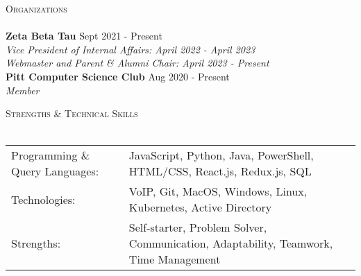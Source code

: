 \documentclass[letterpaper]{article}
\newcommand{\lineunder} {
    \vspace*{-8pt} \\
    \hspace*{-18pt} \hrulefill \\
}
\newcommand{\header} [1] {
    {\hspace*{-18pt}\vspace*{6pt} \textsc{#1}}
    \vspace*{-6pt} \lineunder
}
\begin{document}
\header{Organizations}
\textbf{Zeta Beta Tau} \hfill Sept 2021 - Present\\
\textit{Vice President of Internal Affairs: April 2022 - April 2023} \\
\textit{Webmaster and Parent \& Alumni Chair: April 2023 - Present} \\
\vspace{1mm}
\textbf{Pitt Computer Science Club} \hfill Aug 2020 - Present\\
\textit{Member} \\
\vspace{2mm}

\header{Strengths \& Technical Skills}
\begin{tabular}{ l l }
	Programming \& Query Languages: & JavaScript, Python, Java, PowerShell, HTML/CSS, React.js, Redux.js, SQL \\
	Technologies:                   & VoIP, Git, MacOS, Windows, Linux, Kubernetes, Active Directory \\
    Strengths:                      & Self-starter, Problem Solver, Communication, Adaptability, Teamwork, Time Management \\
\end{tabular}
\vspace{2mm}


\
\end{document}

